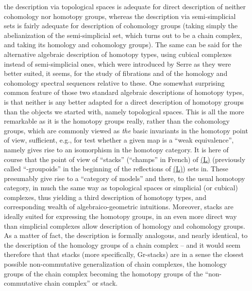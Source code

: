 the description via topological spaces is adequate for direct
description of neither cohomology nor homotopy groups, whereas the
description via semi-simplicial sets is fairly adequate for
description of cohomology groups (taking simply the abelianization of
the semi-simplicial set, which turns out to be a chain complex, and
taking its homology and cohomology groups). The same can be said for
the alternative algebraic description of homotopy types, using cubical
complexes instead of semi-simplicial ones, which were introduced by
Serre as they were better suited, it seems, for the study of
fibrations and of the homology and cohomology spectral sequences
relative to these. One somewhat surprising common feature of those two
standard algebraic descriptions of homotopy types, is that neither is
any better adapted for a direct description of homotopy groups than
the objects we started with, namely topological spaces. This is all
the more remarkable as it is the homotopy groups really, rather than
the cohomology groups, which are commonly viewed as \emph{the} basic
invariants in the homotopy point of view, sufficient, e.g., for test
whether a given map is a ``weak equivalence'', namely gives rise to an
isomorphism in the homotopy category. It is here of course that the
point of view of ``stacks'' (``champs'' in French) of
\hyperref[ch:I]{(L)} (previously called ``\oo-groupoids'' in the
beginning of the reflections of \hyperref[ch:I]{(L)}) sets in. These
presumably give rise to a ``category of models'' and
 there, to the usual homotopy category, in much
the same way as topological spaces or simplicial (or cubical)
complexes, thus yielding a third   description of
homotopy types, and corresponding wealth of algebraico-geometric
intuitions. Moreover, stacks are ideally suited for expressing the
homotopy groups, in an even more direct way than simplicial
complexes allow description of homology and cohomology
groups. As a matter of fact, the description is formally analogous,
and nearly identical, to the description of the homology groups of a
chain complex -- and it would seem therefore that that stacks (more
specifically, Gr-stacks) are in a sense the closest possible
non-commutative generalization of chain complexes, the homology groups
of the chain complex becoming the homotopy groups of the
``non-commutative chain complex'' or stack.


